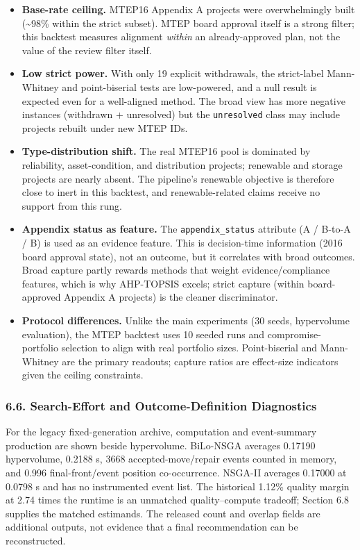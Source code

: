 \documentclass[
]{article}
\providecommand{\tightlist}{%
  \setlength{\itemsep}{0pt}\setlength{\parskip}{0pt}}
\begin{document}
\begin{itemize}
\tightlist
\item
  \textbf{Base-rate ceiling.} MTEP16 Appendix A projects were overwhelmingly built (\textasciitilde98\% within the strict subset). MTEP board approval itself is a strong filter; this backtest measures alignment \emph{within} an already-approved plan, not the value of the review filter itself.
\item
  \textbf{Low strict power.} With only 19 explicit withdrawals, the strict-label Mann-Whitney and point-biserial tests are low-powered, and a null result is expected even for a well-aligned method. The broad view has more negative instances (withdrawn + unresolved) but the \texttt{unresolved} class may include projects rebuilt under new MTEP IDs.
\item
  \textbf{Type-distribution shift.} The real MTEP16 pool is dominated by reliability, asset-condition, and distribution projects; renewable and storage projects are nearly absent. The pipeline's renewable objective is therefore close to inert in this backtest, and renewable-related claims receive no support from this rung.
\item
  \textbf{Appendix status as feature.} The \texttt{appendix\_status} attribute (A / B-to-A / B) is used as an evidence feature. This is decision-time information (2016 board approval state), not an outcome, but it correlates with broad outcomes. Broad capture partly rewards methods that weight evidence/compliance features, which is why AHP-TOPSIS excels; strict capture (within board-approved Appendix A projects) is the cleaner discriminator.
\item
  \textbf{Protocol differences.} Unlike the main experiments (30 seeds, hypervolume evaluation), the MTEP backtest uses 10 seeded runs and compromise-portfolio selection to align with real portfolio sizes. Point-biserial and Mann-Whitney are the primary readouts; capture ratios are effect-size indicators given the ceiling constraints.
\end{itemize}

\subsubsection{6.6. Search-Effort and Outcome-Definition Diagnostics}\label{search-effort-and-outcome-definition-diagnostics}

For the legacy fixed-generation archive, computation and event-summary production are shown beside hypervolume. BiLo-NSGA averages 0.17190 hypervolume, 0.2188 s, 3668 accepted-move/repair events counted in memory, and 0.996 final-front/event position co-occurrence. NSGA-II averages 0.17000 at 0.0798 s and has no instrumented event list. The historical 1.12\% quality margin at 2.74 times the runtime is an unmatched quality--compute tradeoff; Section 6.8 supplies the matched estimands. The released count and overlap fields are additional outputs, not evidence that a final recommendation can be reconstructed.
\end{document}
